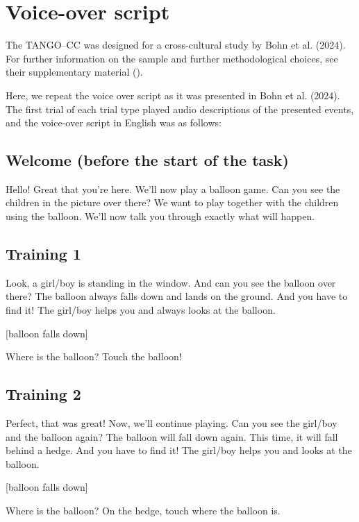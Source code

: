 \documentclass[
  man,floatsintext]{apa7}
\begin{document}
\section{Voice-over script}\label{voice-over-script}

The TANGO--CC was designed for a cross-cultural study by Bohn et al. (2024). For further information on the sample and further methodological choices, see their supplementary material ().

Here, we repeat the voice over script as it was presented in Bohn et al. (2024). The first trial of each trial type played audio descriptions of the presented events, and the voice-over script in English was as follows:

\subsection{Welcome (before the start of the task)}\label{welcome-before-the-start-of-the-task}

Hello! Great that you're here. We'll now play a balloon game. Can you see the children in the picture over there? We want to play together with the children using the balloon. We'll now talk you through exactly what will happen.

\subsection{Training 1}\label{training-1}

Look, a girl/boy is standing in the window. And can you see the balloon over there? The balloon always falls down and lands on the ground. And you have to find it! The girl/boy helps you and always looks at the balloon.

{[}balloon falls down{]}

Where is the balloon? Touch the balloon!

\subsection{Training 2}\label{training-2}

Perfect, that was great! Now, we'll continue playing. Can you see the girl/boy and the balloon again? The balloon will fall down again. This time, it will fall behind a hedge. And you have to find it! The girl/boy helps you and looks at the balloon.

{[}balloon falls down{]}

Where is the balloon? On the hedge, touch where the balloon is.
\end{document}
